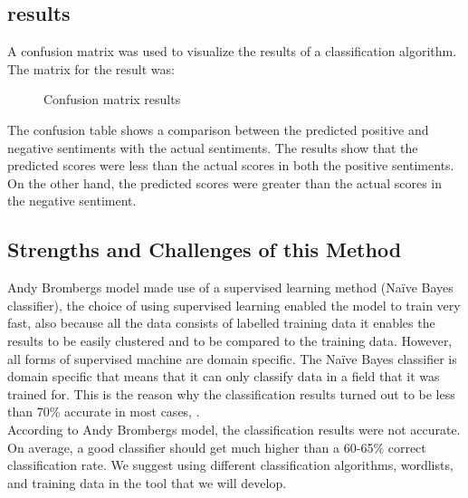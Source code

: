 \clearpage
\subsection{results}

A confusion matrix was used to visualize the results of a classification algorithm. The matrix for
the result was:

\begin{figure}[h]
  \centering
  \caption[Confusion matrix results]%
  {Confusion matrix results}
  \label{fig:ALAP:sm3}
\end{figure}


The confusion table shows a comparison between the predicted positive and negative sentiments
with the actual sentiments. The results show that the predicted scores were less than the actual
scores in both the positive sentiments. On the other hand, the predicted scores were greater than
the actual scores in the negative sentiment.

\subsection{Strengths and Challenges of this Method}
Andy Bromberg\textquotesingle s model made use of a supervised learning method (Naïve Bayes classifier), the
choice of using supervised learning enabled the model to train very fast, also because all the data
consists of labelled training data it enables the results to be easily clustered and to be compared to
the training data. However, all forms of supervised machine are domain specific. The Naïve Bayes
classifier is domain specific that means that it can only classify data in a field that it was trained
for. This is the reason why the classification results turned out to be less than 70\% accurate in most
cases, \cite{ref31}.
\leavevmode\\
According to Andy Bromberg\textquotesingle s model, the classification results were not accurate. On average, a
good classifier should get much higher than a 60-65\% correct classification rate. We suggest using
different classification algorithms, wordlists, and training data in the tool that we will develop.



